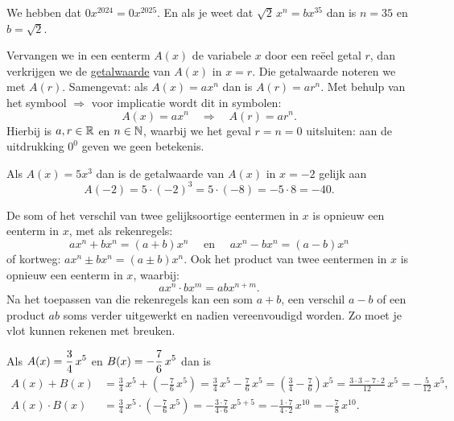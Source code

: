 \documentclass{ximera}
\begin{document}
\begin{example} 
We hebben dat $0x^{2024} = 0x^{2025}$. En als je weet dat $\sqrt{2}\,x^n = bx^{35}$ dan is $n = 35$ en $b = \sqrt{2}$.
\end{example} 



Vervangen we in een eenterm $A(x)$ de variabele $x$ door een re\"eel getal $r$, dan verkrijgen we de \underline{getalwaarde} van $A(x)$ in $x = r$. Die getalwaarde noteren we met $A(r)$. Samengevat: als $A(x) = ax^n$ dan is $A(r) = ar^n$. Met behulp van het symbool $\Rightarrow$ voor implicatie wordt dit in symbolen:
\[
A(x) = ax^n \quad \Rightarrow \quad A(r) = a r^n.
\]
Hierbij is $a,r \in \mathbb{R}$ en $n \in \mathbb{N}$, waarbij we het geval $r = n = 0$ uitsluiten: aan de uitdrukking $0^0$ geven we geen betekenis.

\begin{example} 
Als $A(x) = 5x^3$ dan is de getalwaarde van $A(x)$ in $x = -2$ gelijk aan 
\[
A(-2) = 5 \cdot (-2)^3 = 5 \cdot (-8) = - 5 \cdot 8 = -40.
\]
\end{example} 

De som of het verschil van twee gelijksoortige eentermen in $x$ is opnieuw een eenterm in $x$, met als rekenregels:
\[
ax^n + bx^n = (a+b)x^n \quad \text{ en } \quad ax^n - bx^n = (a-b)x^n
\]
of kortweg: $ax^n \pm bx^n = (a\pm b)x^n$. Ook het product van twee eentermen in $x$ is opnieuw een eenterm in $x$, waarbij:
\[
ax^n \cdot bx^m = abx^{n+m}.
\]
Na het toepassen van die rekenregels kan een som $a+b$, een verschil $a-b$ of een product $ab$ soms verder uitgewerkt en nadien vereenvoudigd worden. Zo moet je vlot kunnen rekenen met breuken.

\begin{example} 
Als $\displaystyle A(x) = \frac{3}{4}\,x^5$ en $\displaystyle B(x) = -\frac{7}{6}\,x^5$ dan is 
\begin{align*}
A(x) + B(x) & = \frac{3}{4}\,x^5 + \left(-\frac{7}{6}\,x^5\right) 
= \frac{3}{4}\,x^5 - \frac{7}{6}\,x^5
= \left(\frac{3}{4} - \frac{7}{6}\right)x^5 
= \frac{3 \cdot 3 - 7 \cdot 2}{12}\,x^5 
= -\frac{5}{12}\,x^5, \\
A(x) \cdot B(x) & = \frac{3}{4}\,x^5 \cdot \left(-\frac{7}{6}\,x^5\right) = - \frac{3 \cdot 7}{4 \cdot 6}\,x^{5+5} = -\frac{1\cdot 7}{4 \cdot 2}\, x^{10} = -\frac{7}{8}\,x^{10}. 
\end{align*}
\end{example} 
\end{document}
